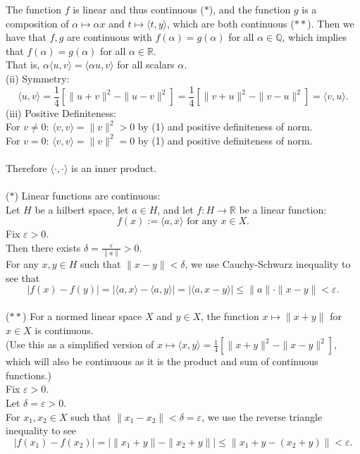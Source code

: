 \begin{enumerate}
    The function $f$ is linear and thus continuous ($\ast$), and the function $g$ is a composition of $\alpha\mapsto\alpha x$ and $t\mapsto\langle t,y\rangle$, which are both continuous ($\ast\ast$).
    Then we have that $f,g$ are continuous with $f(\alpha)=g(\alpha)$ for all $\alpha\in\mathbb{Q}$, which implies that $f(\alpha)=g(\alpha)$ for all $\alpha\in\mathbb{R}$.
    \\That is, $\alpha\langle u,v\rangle=\langle \alpha u,v\rangle$ for all scalars $\alpha$.
    \\(ii) Symmetry:
    \[\langle u,v \rangle = \frac{1}{4}[\|u+v\|^2-\|u-v\|^2]=\frac{1}{4}[\|v+u\|^2-\|v-u\|^2]=\langle v,u\rangle.\]
    (iii) Positive Definiteness:
    \\For $v\neq0$: $\langle v,v \rangle = \|v\|^2>0$ by (1) and positive definiteness of norm.
    \\For $v=0$: $\langle v,v \rangle = \|v\|^2=0$ by (1) and positive definiteness of norm.\\
    \\Therefore $\langle\cdot,\cdot\rangle$ is an inner product.\\
    \\($\ast$) Linear functions are continuous:
    \\Let $H$ be a hilbert space, let $a\in H$, and let $f:H\to\mathbb{R}$ be a linear function:
    \[
        f(x):=\langle a,x\rangle\text{ for any }x\in X.
    \]
    Fix $\varepsilon>0$.
    \\Then there exists $\delta=\frac{\varepsilon}{\|a\|}>0$.
    \\For any $x,y\in H$ such that $\|x-y\|<\delta$, we use Cauchy-Schwarz inequality to see that
    \[
        |f(x)-f(y)|=|\langle a,x\rangle-\langle a,y\rangle|=|\langle a,x-y\rangle|\le\|a\|\cdot\|x-y\|<\varepsilon.
    \]
    \\($\ast\ast$) For a normed linear space $X$ and $y\in X$, the function $x\mapsto\|x+y\|$ for $x\in X$ is continuous.
    \\(Use this as a simplified version of $x\mapsto\langle x,y\rangle=\frac{1}{4}[\|x+y\|^2-\|x-y\|^2]$, which will also be continuous as it is the product and sum of continuous functions.)
    \\Fix $\varepsilon>0$.
    \\Let $\delta=\varepsilon>0$.
    \\For $x_1,x_2\in X$ such that $\|x_1-x_2\|<\delta=\varepsilon$, we use the reverse triangle inequality to see
    \[
        |f(x_1)-f(x_2)|=|\|x_1+y\|-\|x_2+y\||\le\|x_1+y-(x_2+y)\|<\varepsilon.
\]
\end{enumerate}
